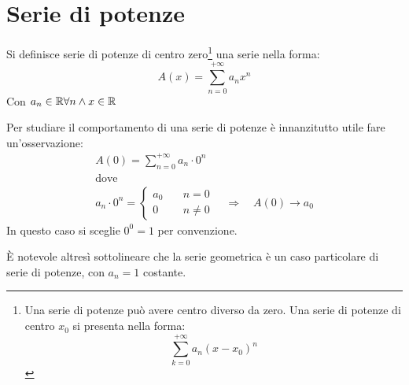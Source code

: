 %
%
%
%


\section{Serie di potenze}
\begin{defin}
	Si definisce serie di potenze di centro zero\footnote{Una serie di potenze può avere centro diverso da zero. Una serie di potenze di centro $x_0$ si presenta nella forma:
		\[
			\sum_{k=0}^{+\infty} a_n (x-x_0)^n
		\]} una serie nella forma:
	\[
		A(x)=\sum_{n=0}^{+\infty} a_n x^n
	\]
	Con $a_n\in\mathbb{R}\forall n\land x\in\mathbb{R}$
\end{defin}
Per studiare il comportamento di una serie di potenze è innanzitutto utile fare un'osservazione:
\begin{gather*}
	A(0)=\sum_{n=0}^{+\infty} a_n\cdot0^n \\
	\text{dove}\\
	a_n\cdot0^n = \begin{cases}
		a_0\quad & n=0    \\
		0 \quad  & n\neq0
	\end{cases}\quad\Rightarrow\quad A(0)\to a_0
\end{gather*}
In questo caso si sceglie $0^0=1$ per convenzione.

È notevole altresì sottolineare che la serie geometrica è un caso particolare di serie di potenze, con $a_n=1$ costante.

